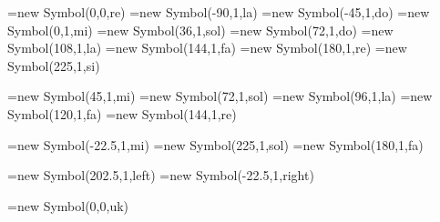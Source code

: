 \def\mastver{V200}

\usepackage{tikz}
\usetikzlibrary{bending,shapes.geometric,shapes.misc,positioning,decorations.pathmorphing}




\pgfoonew \SymREd=new Symbol(0,0,re)
\pgfoonew \SymLAb=new Symbol(-90,1,la)
\pgfoonew \SymDOb=new Symbol(-45,1,do)
\pgfoonew \SymMIm=new Symbol(0,1,mi)
\pgfoonew \SymSOLu=new Symbol(36,1,sol)
\pgfoonew \SymDOu=new Symbol(72,1,do)
\pgfoonew \SymLAu=new Symbol(108,1,la)
\pgfoonew \SymFAu=new Symbol(144,1,fa)
\pgfoonew \SymREm=new Symbol(180,1,re)
\pgfoonew \SymSIb=new Symbol(225,1,si)

\pgfoonew \SymMIh=new Symbol(45,1,mi)
\pgfoonew \SymSOLh=new Symbol(72,1,sol)
\pgfoonew \SymLAh=new Symbol(96,1,la)
\pgfoonew \SymFAh=new Symbol(120,1,fa)
\pgfoonew \SymREh=new Symbol(144,1,re)

\pgfoonew \SymMIl=new Symbol(-22.5,1,mi)
\pgfoonew \SymSOLl=new Symbol(225,1,sol)
\pgfoonew \SymFAl=new Symbol(180,1,fa)

\pgfoonew \SymGOq=new Symbol(202.5,1,left)
\pgfoonew \SymGOs=new Symbol(-22.5,1,right)

\pgfoonew \SymUKw=new Symbol(0,0,uk)
   

\newdimen\Notesize
\Notesize=22pt
\newdimen\Vscale
\Vscale=16pt
\newdimen\Vzero
\Vzero=51pt
\newdimen\Hscale
\Hscale=40pt
\newdimen\LineS
\LineS=-40pt
\newdimen\LineA
\LineA=80pt

